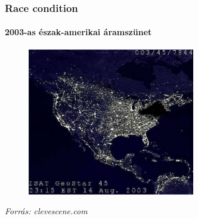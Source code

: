\begin{frame}
\frametitle{Race condition}
\framesubtitle{2003-as észak-amerikai áramszünet}

\begin{figure}
	\includegraphics[width=0.65\textwidth]{img/blackout2003.jpg}
\end{figure}
{\hspace*{\fill}\tiny\textit{Forrás: clevescene.com}}

\end{frame}